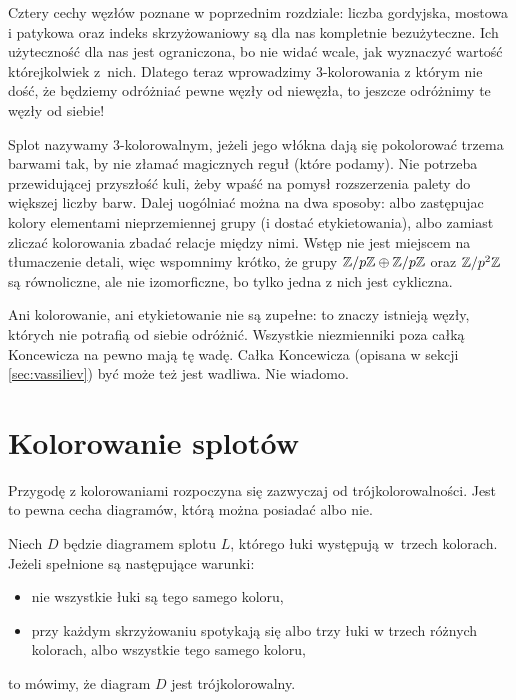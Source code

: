 
Cztery cechy węzłów poznane w poprzednim rozdziale: liczba gordyjska, mostowa i patykowa oraz indeks skrzyżowaniowy są dla nas kompletnie bezużyteczne.
Ich użyteczność dla nas jest ograniczona, bo nie widać wcale, jak wyznaczyć wartość którejkolwiek z~nich.
Dlatego teraz wprowadzimy 3-kolorowania z którym nie dość, że będziemy odróżniać pewne węzły od niewęzła, to jeszcze odróżnimy te węzły od siebie!

Splot nazywamy 3-kolorowalnym, jeżeli jego włókna dają się pokolorować trzema barwami tak, by nie złamać magicznych reguł (które podamy).
Nie potrzeba przewidującej przyszłość kuli, żeby wpaść na pomysł rozszerzenia palety do większej liczby barw.
Dalej uogólniać można na dwa sposoby: albo zastępujac kolory elementami nieprzemiennej grupy (i dostać etykietowania), albo zamiast zliczać kolorowania zbadać relacje między nimi.
Wstęp nie jest miejscem na tłumaczenie detali, więc wspomnimy krótko, że grupy $\mathbb Z/p\mathbb Z \oplus \mathbb Z/p\mathbb Z$ oraz $\mathbb Z/p^2 \mathbb Z$ są równoliczne, ale nie izomorficzne, bo tylko jedna z nich jest cykliczna.

Ani kolorowanie, ani etykietowanie nie są zupełne: to znaczy istnieją węzły, których nie potrafią od siebie odróżnić.
Wszystkie niezmienniki poza całką Koncewicza na pewno mają tę wadę.
Całka Koncewicza (opisana w sekcji \ref{sec:vassiliev}) być może też jest wadliwa.
Nie wiadomo.

\section{Kolorowanie splotów}
%

Przygodę z kolorowaniami rozpoczyna się zazwyczaj od trójkolorowalności.
Jest to pewna cecha diagramów, którą można posiadać albo nie.

\begin{definition}[trójkolorowalność]
%
    Niech $D$ będzie diagramem splotu $L$, którego łuki występują w~trzech kolorach.
    Jeżeli spełnione są następujące warunki:
    \begin{itemize}[leftmargin=*]
        \item nie wszystkie łuki są tego samego koloru,
        \item przy każdym skrzyżowaniu spotykają się albo trzy łuki w trzech różnych kolorach, albo wszystkie tego samego koloru,
    \end{itemize}
    to mówimy, że diagram $D$ jest trójkolorowalny.
\end{definition}

